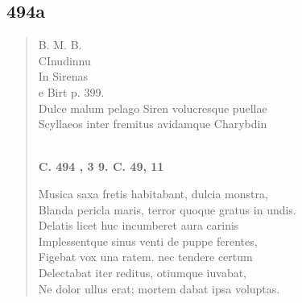 \documentclass[11pt, a4paper]{report}
\begin{document}
            \subsection*{494a}
      \begin{verse}
      B. M. B. \\ CInudinnu \\ In Sirenas \\ e Birt p. 399. \\ Dulce malum pelago Siren volucresque puellae \\ Scyllaeos inter fremitus avidamque Charybdin \\ 
        ﻿\pagebreak 
    \begin{center} \textbf{C. 494 , 3 9. C. 49, 11} \end{center} \marginpar{[52]} Musica saxa fretis habitabant, dulcia monstra, \\ Blanda pericla maris, terror quoque gratus in undis. \\ Delatis licet huc incumberet aura carinis \\ Implessentque sinus venti de puppe ferentes, \\ Figebat vox una ratem. nec tendere certum \\ Delectabat iter reditus, otiumque iuvabat, \\ Ne dolor ullus erat; mortem dabat ipsa voluptas. \\ 
      \end{verse}
  
\end{document}
